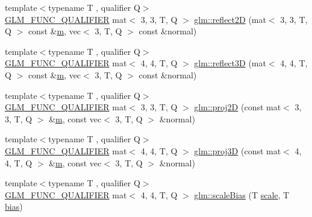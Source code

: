 \begin{DoxyCompactItemize}
\item 
{\footnotesize template$<$typename T , qualifier Q$>$ }\\\mbox{\hyperlink{setup_8hpp_a33fdea6f91c5f834105f7415e2a64407}{G\+L\+M\+\_\+\+F\+U\+N\+C\+\_\+\+Q\+U\+A\+L\+I\+F\+I\+ER}} mat$<$ 3, 3, T, Q $>$ \mbox{\hyperlink{namespaceglm_ac437357f6021e295f9c4470913141014}{glm\+::reflect2D}} (mat$<$ 3, 3, T, Q $>$ const \&\mbox{\hyperlink{_s_d_l__opengl__glext_8h_af593500c283bf1a787a6f947f503a5c2}{m}}, vec$<$ 3, T, Q $>$ const \&normal)
\item 
{\footnotesize template$<$typename T , qualifier Q$>$ }\\\mbox{\hyperlink{setup_8hpp_a33fdea6f91c5f834105f7415e2a64407}{G\+L\+M\+\_\+\+F\+U\+N\+C\+\_\+\+Q\+U\+A\+L\+I\+F\+I\+ER}} mat$<$ 4, 4, T, Q $>$ \mbox{\hyperlink{namespaceglm_ad1f2111494429316800124b0d31069dc}{glm\+::reflect3D}} (mat$<$ 4, 4, T, Q $>$ const \&\mbox{\hyperlink{_s_d_l__opengl__glext_8h_af593500c283bf1a787a6f947f503a5c2}{m}}, vec$<$ 3, T, Q $>$ const \&normal)
\item 
{\footnotesize template$<$typename T , qualifier Q$>$ }\\\mbox{\hyperlink{setup_8hpp_a33fdea6f91c5f834105f7415e2a64407}{G\+L\+M\+\_\+\+F\+U\+N\+C\+\_\+\+Q\+U\+A\+L\+I\+F\+I\+ER}} mat$<$ 3, 3, T, Q $>$ \mbox{\hyperlink{group__gtx__transform2_ga5b992a0cdc8298054edb68e228f0d93e}{glm\+::proj2D}} (const mat$<$ 3, 3, T, Q $>$ \&\mbox{\hyperlink{_s_d_l__opengl__glext_8h_af593500c283bf1a787a6f947f503a5c2}{m}}, const vec$<$ 3, T, Q $>$ \&normal)
\item 
{\footnotesize template$<$typename T , qualifier Q$>$ }\\\mbox{\hyperlink{setup_8hpp_a33fdea6f91c5f834105f7415e2a64407}{G\+L\+M\+\_\+\+F\+U\+N\+C\+\_\+\+Q\+U\+A\+L\+I\+F\+I\+ER}} mat$<$ 4, 4, T, Q $>$ \mbox{\hyperlink{group__gtx__transform2_gaa2b7f4f15b98f697caede11bef50509e}{glm\+::proj3D}} (const mat$<$ 4, 4, T, Q $>$ \&\mbox{\hyperlink{_s_d_l__opengl__glext_8h_af593500c283bf1a787a6f947f503a5c2}{m}}, const vec$<$ 3, T, Q $>$ \&normal)
\item 
{\footnotesize template$<$typename T , qualifier Q$>$ }\\\mbox{\hyperlink{setup_8hpp_a33fdea6f91c5f834105f7415e2a64407}{G\+L\+M\+\_\+\+F\+U\+N\+C\+\_\+\+Q\+U\+A\+L\+I\+F\+I\+ER}} mat$<$ 4, 4, T, Q $>$ \mbox{\hyperlink{group__gtx__transform2_gabf249498b236e62c983d90d30d63c99c}{glm\+::scale\+Bias}} (T \mbox{\hyperlink{_s_d_l__opengl__glext_8h_a281421b881aa7a1266842b73a3bc7655}{scale}}, T \mbox{\hyperlink{_s_d_l__opengl__glext_8h_a39c3ffa18f420251c5d132dd8c1c6137}{bias}})

\end{DoxyCompactItemize}
